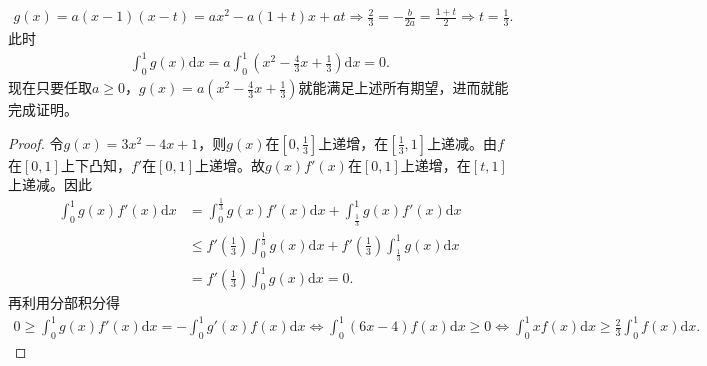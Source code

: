 \documentclass[../../main.tex]{subfiles}%
\begin{document}
\begin{note}
\begin{align*}
g\left( x \right) =a\left( x-1 \right) \left( x-t \right) =ax^2-a\left( 1+t \right) x+at\Longrightarrow \frac{2}{3}=-\frac{b}{2a}=\frac{1+t}{2}\Longrightarrow t=\frac{1}{3}.
\end{align*}
此时
\begin{align*}
\int_0^1{g\left( x \right) \mathrm{d}x}=a\int_0^1{\left( x^2-\frac{4}{3}x+\frac{1}{3} \right) \mathrm{d}x}=0.
\end{align*}
现在只要任取$a\geqslant 0$，$g(x)=a\left( x^2-\frac{4}{3}x+\frac{1}{3} \right)$就能满足上述所有期望，进而就能完成证明。
\end{note}
\begin{proof}

令$g(x)=3x^2-4x+1$，则$g(x)$在$[0,\frac{1}{3}]$上递增，在$[\frac{1}{3},1]$上递减。由$f$在$[0,1]$上下凸知，$f'$在$[0,1]$上递增。故$g(x)f'(x)$在$[0,1]$上递增，在$[t,1]$上递减。因此
\begin{align*}
\int_0^1{g\left( x \right) f'\left( x \right) \mathrm{d}x}&=\int_0^{\frac{1}{3}}{g\left( x \right) f'\left( x \right) \mathrm{d}x}+\int_{\frac{1}{3}}^1{g\left( x \right) f'\left( x \right) \mathrm{d}x} \\
&\leqslant f'\left( \frac{1}{3} \right) \int_0^{\frac{1}{3}}{g\left( x \right) \mathrm{d}x}+f'\left( \frac{1}{3} \right) \int_{\frac{1}{3}}^1{g\left( x \right) \mathrm{d}x} \\
&=f'\left( \frac{1}{3} \right) \int_0^1{g\left( x \right) \mathrm{d}x}=0.
\end{align*}
再利用分部积分得
\begin{align*}
0\geqslant \int_0^1{g\left( x \right) f'\left( x \right) \mathrm{d}x}=-\int_0^1{g'\left( x \right) f\left( x \right) \mathrm{d}x}\Longleftrightarrow \int_0^1{\left( 6x-4 \right) f\left( x \right) \mathrm{d}x}\geqslant 0\Longleftrightarrow \int_0^1{xf\left( x \right) \mathrm{d}x}\geqslant \frac{2}{3}\int_0^1{f\left( x \right) \mathrm{d}x}.
\end{align*}

\end{proof}
\end{document}
